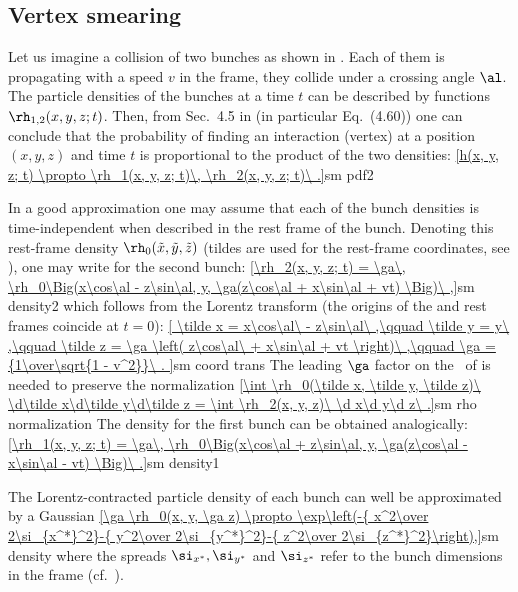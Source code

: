 \subsection{Vertex smearing}


Let us imagine a collision of two bunches as shown in . Each of them is propagating with a speed $v$ in the  frame, they collide under a crossing angle $\al$. The particle densities of the bunches at a time $t$ can be described by functions $\rh_{1, 2}(x, y, z; t)$. Then, from Sec.~4.5 in  (in particular Eq.~(4.60)) one can conclude that the probability of finding an interaction (vertex) at a position $(x, y, z)$ and time $t$ is proportional to the product of the two densities:
\eqref{h(x, y, z; t) \propto \rh_1(x, y, z; t)\, \rh_2(x, y, z; t)\ .}{sm pdf2}

In a good approximation one may assume that each of the bunch densities is time-independent when described in the rest frame of the bunch. Denoting this rest-frame density $\rh_0(\tilde x, \tilde y, \tilde z)$ (tildes are used for the rest-frame coordinates, see ), one may write for the second bunch:
\eqref{\rh_2(x, y, z; t) = \ga\, \rh_0\Big(x\cos\al - z\sin\al, y, \ga(z\cos\al + x\sin\al + vt) \Big)\ ,}{sm density2}
which follows from the Lorentz transform (the origins of the  and rest frames coincide at $t=0$):
\eqref{
	\tilde x = x\cos\al\ - z\sin\al\ ,\qquad
	\tilde y = y\ ,\qquad
	\tilde z = \ga \left( z\cos\al\ + x\sin\al + vt \right)\ ,\qquad
	\ga = {1\over\sqrt{1 - v^2}}\ .
}{sm coord trans}
The leading $\ga$ factor on the \rhs~of  is needed to preserve the normalization
\eqref{\int \rh_0(\tilde x, \tilde y, \tilde z)\ \d\tilde x\d\tilde y\d\tilde z = \int \rh_2(x, y, z)\ \d x\d y\d z\ .}{sm rho normalization}
The density for the first bunch can be obtained analogically:
\eqref{\rh_1(x, y, z; t) = \ga\, \rh_0\Big(x\cos\al + z\sin\al, y, \ga(z\cos\al - x\sin\al - vt) \Big)\ .}{sm density1}

The Lorentz-contracted particle density of each bunch can well be approximated by a Gaussian
\eqref{\ga \rh_0(x, y, \ga z) \propto \exp\left(-{ x^2\over 2\si_{x^*}^2}-{ y^2\over 2\si_{y^*}^2}-{ z^2\over 2\si_{z^*}^2}\right),}{sm density}
where the spreads $\si_{x^*}, \si_{y^*}$ and $\si_{z^*}$ refer to the bunch dimensions in the  frame (cf.~).

